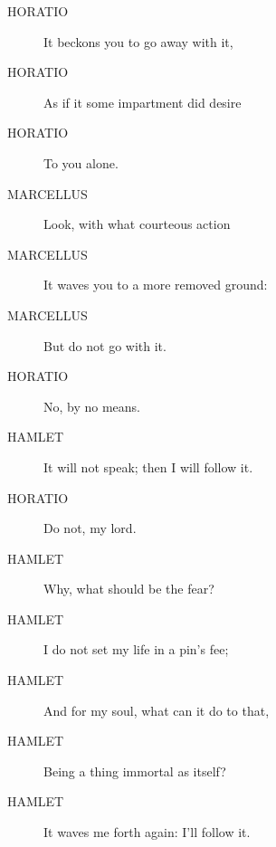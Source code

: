 \documentclass{article}
\begin{document}
\begin{description}
            
\item[HORATIO] It beckons you to go away with it,
\item[HORATIO] As if it some impartment did desire
\item[HORATIO] To you alone.
\end{description}
          
\begin{description}
            
\item[MARCELLUS] Look, with what courteous action
\item[MARCELLUS] It waves you to a more removed ground:
\item[MARCELLUS] But do not go with it.
\end{description}
          
\begin{description}
            
\item[HORATIO] No, by no means.
\end{description}
          
\begin{description}
            
\item[HAMLET] It will not speak; then I will follow it.
\end{description}
          
\begin{description}
            
\item[HORATIO] Do not, my lord.
\end{description}
          
\begin{description}
            
\item[HAMLET] Why, what should be the fear?
\item[HAMLET] I do not set my life in a pin's fee;
\item[HAMLET] And for my soul, what can it do to that,
\item[HAMLET] Being a thing immortal as itself?
\item[HAMLET] It waves me forth again: I'll follow it.
\end{description}
          
\end{document}
